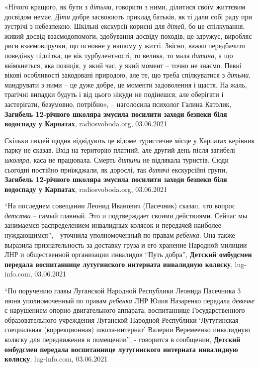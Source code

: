 «Нічого кращого, як бути з \emph{дітьми}, говорити з ними, ділитися своїм життєвим
досвідом немає. \emph{Діти} добре засвоюють приклад батьків, як ті дали собі раду при
зустрічі з небезпекою. Шкільні екскурсії корисні для \emph{дітей}, бо це спілкування,
живий досвід взаємодопомоги, здобування досвіду походів, це здружує, виробляє
риси взаємовиручки, що основне у нашому у житті. Звісно, важко передбачити
поведінку підлітка, це вік турбулентності, то велика, то мала \emph{дитина}, а що
ввімкнеться, яка позиція, у який час, у який момент – точно не знаємо. Певні
вікові особливості закодовані природою, але те, що треба спілкуватися з \emph{дітьми},
мандрувати з ними – це дуже добре, це моменти задоволення і щастя. На жаль,
трагічні випадки будуть і від цього нікуди не подінешся, але оберігати і
застерігати, безумовно, потрібно», – наголосила психолог Галина Католик,
\textbf{Загибель 12-річного школяра змусила посилити заходи безпеки біля водоспаду у Карпатах},
radiosvoboda.org, 03.06.2021

Скільки людей щодня відвідують це відоме туристичне місце у Карпатах керівник
парку не сказав. Вхід на територію платний, але другий день після загибелі
\emph{школяра}, каса не працювала. Смерть \emph{дитини} не відлякала туристів. Сюди сьогодні
постійно приїжджали, як дорослі, так \emph{дитячі} екскурсійні групи,
\textbf{Загибель 12-річного школяра змусила посилити заходи безпеки біля водоспаду у Карпатах},
radiosvoboda.org, 03.06.2021

\enquote{На последнем совещании Леонид Иванович (Пасечник) сказал, что вопрос
\emph{детства} – самый главный. Это и подтверждает своими действиями. Сейчас мы
занимаемся распределением инвалидных колясок и передачей наиболее нуждающимся},
- уточнила уполномоченный по правам \emph{ребенка}. Она также выразила
признательность за доставку груза и его хранение Народной милиции ЛНР и
общественной организации инвалидов \enquote{Путь добра}, 
\textbf{Детский омбудсмен передала воспитаннице лутугинского интерната инвалидную коляску},
lug-info.com, 03.06.2021

\enquote{По поручению главы Луганской Народной Республики Леонида Пасечника 3 июня
уполномоченный по правам \emph{ребенка} ЛНР Юлия Назаренко передала \emph{девочке} с
нарушением опорно-двигательного аппарата, воспитаннице Государственного
образовательного учреждения Луганской Народной Республики \enquote{Лутугинская
специальная (коррекционная) школа-интернат} Валерии Веремеенко инвалидную
коляску для передвижения в помещении}, - говорится в сообщении,
\textbf{Детский омбудсмен передала воспитаннице лутугинского интерната инвалидную коляску},
lug-info.com, 03.06.2021

